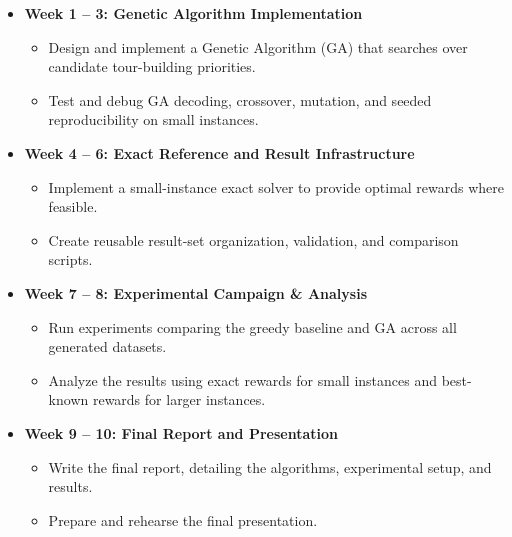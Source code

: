 \documentclass[report,english,cleveref,autoref,a4paper]{lipics-v2021}
\begin{document}
\begin{itemize}
  \item \textbf{Week 1 -- 3: Genetic Algorithm Implementation}
  \begin{itemize}
    \item Design and implement a Genetic Algorithm (GA) that searches over candidate tour-building priorities.
    \item Test and debug GA decoding, crossover, mutation, and seeded reproducibility on small instances.
  \end{itemize}
  
  \item \textbf{Week 4 -- 6: Exact Reference and Result Infrastructure}
  \begin{itemize}
    \item Implement a small-instance exact solver to provide optimal rewards where feasible.
    \item Create reusable result-set organization, validation, and comparison scripts.
  \end{itemize}
  
  \item \textbf{Week 7 -- 8: Experimental Campaign \& Analysis}
  \begin{itemize}
    \item Run experiments comparing the greedy baseline and GA across all generated datasets.
    \item Analyze the results using exact rewards for small instances and best-known rewards for larger instances.
  \end{itemize}

  \item \textbf{Week 9 -- 10: Final Report and Presentation}
  \begin{itemize}
    \item Write the final report, detailing the algorithms, experimental setup, and results.
    \item Prepare and rehearse the final presentation.
  \end{itemize}
\end{itemize}


\end{document}

